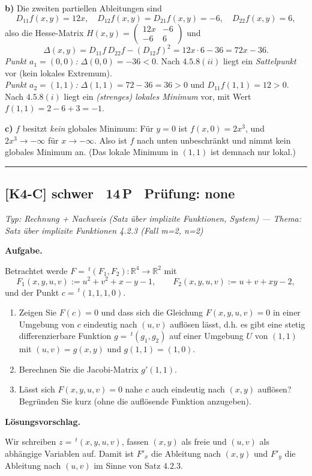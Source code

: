 \documentclass[a4paper,11pt]{article}
\begin{document}
\textbf{b)} Die zweiten partiellen Ableitungen sind
\[ D_{11}f(x,y)=12x,\quad D_{12}f(x,y)=D_{21}f(x,y)=-6,\quad D_{22}f(x,y)=6, \]
also die Hesse-Matrix $H(x,y)=\begin{pmatrix}12x & -6\\ -6 & 6\end{pmatrix}$ und
\[ \Delta(x,y)=D_{11}f\,D_{22}f-(D_{12}f)^2=12x\cdot 6-36=72x-36. \]
\textit{Punkt $a_1=(0,0)$:} $\Delta(0,0)=-36<0$. Nach $4.5.8(ii)$ liegt ein \emph{Sattelpunkt} vor (kein lokales Extremum).\\
\textit{Punkt $a_2=(1,1)$:} $\Delta(1,1)=72-36=36>0$ und $D_{11}f(1,1)=12>0$. Nach $4.5.8(i)$ liegt ein \emph{(strenges) lokales Minimum} vor, mit Wert $f(1,1)=2-6+3=-1$.

\textbf{c)} $f$ besitzt \emph{kein} globales Minimum: Für $y=0$ ist $f(x,0)=2x^3$, und $2x^3\to-\infty$ für $x\to-\infty$. Also ist $f$ nach unten unbeschränkt und nimmt kein globales Minimum an. (Das lokale Minimum in $(1,1)$ ist demnach nur lokal.)\par\bigskip\hrule\bigskip
\subsection*{[K4-C] \normalfont schwer \textbullet\ 14\,P \textbullet\ Pr\"ufung: none}
\textit{Typ: Rechnung + Nachweis (Satz über implizite Funktionen, System)  ---  Thema: Satz über implizite Funktionen 4.2.3 (Fall m=2, n=2)}\par\smallskip
\textbf{Aufgabe.}\par
Betrachtet werde $F=\,^{t}(F_1,F_2):\mathbb{R}^4\to\mathbb{R}^2$ mit
\[ F_1(x,y,u,v):=u^2+v^2+x-y-1,\qquad F_2(x,y,u,v):=u+v+xy-2, \]
und der Punkt $c=\,^{t}(1,1,1,0)$.
\begin{enumerate}[label=\alph*)]
  \item Zeigen Sie $F(c)=0$ und dass sich die Gleichung $F(x,y,u,v)=0$ in einer Umgebung von $c$ eindeutig \glqq nach $(u,v)$ auflösen\grqq{} lässt, d.h. es gibt eine stetig differenzierbare Funktion $g=\,^{t}(g_1,g_2)$ auf einer Umgebung $U$ von $(1,1)$ mit $(u,v)=g(x,y)$ und $g(1,1)=(1,0)$.
  \item Berechnen Sie die Jacobi-Matrix $g'(1,1)$.
  \item Lässt sich $F(x,y,u,v)=0$ nahe $c$ auch eindeutig \glqq nach $(x,y)$ auflösen\grqq? Begründen Sie kurz (ohne die auflösende Funktion anzugeben).
\end{enumerate}\par\smallskip
\textbf{L\"osungsvorschlag.}\par
Wir schreiben $z=\,^{t}(x,y,u,v)$, fassen $(x,y)$ als \glqq freie\grqq{} und $(u,v)$ als \glqq abhängige\grqq{} Variablen auf. Damit ist $F'_x$ die Ableitung nach $(x,y)$ und $F'_y$ die Ableitung nach $(u,v)$ im Sinne von Satz $4.2.3$.
\end{document}
